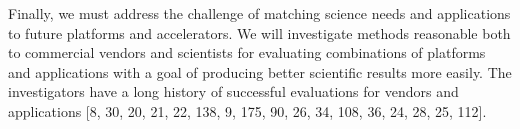 Finally, we must address the challenge of matching science needs and applications to future
platforms and accelerators. We will investigate methods reasonable both to commercial vendors
and scientists for evaluating combinations of platforms and applications with a goal of producing
better scientific results more easily. The investigators have a long history of successful evaluations
for vendors and applications [8, 30, 20, 21, 22, 138, 9, 175, 90, 26, 34, 108, 36, 24, 28, 25, 112].
